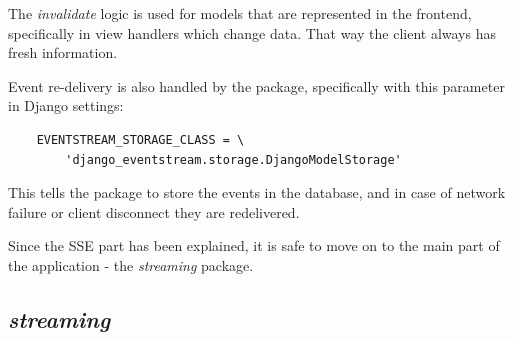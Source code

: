 The \textit{invalidate} logic is used for models that are represented in the frontend,
specifically in view handlers which change data. That way the client always has fresh information.

Event re-delivery is also handled by the package, specifically with this parameter in Django settings:

\begin{flushleft}
    \begin{verbatim}
    EVENTSTREAM_STORAGE_CLASS = \
        'django_eventstream.storage.DjangoModelStorage'
    \end{verbatim}
\end{flushleft}

This tells the package to store the events in the database, and in case of network failure or client disconnect they
are redelivered.

Since the SSE part has been explained, it is safe to move on to the main part of the application - the \textit{streaming} package.

\subsection{\textit{streaming}}


